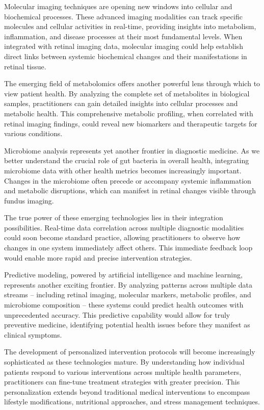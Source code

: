 \documentclass[
  Letterpaper,
]{scrbook}
\begin{document}
Molecular imaging techniques are opening new windows into cellular and
biochemical processes. These advanced imaging modalities can track
specific molecules and cellular activities in real-time, providing
insights into metabolism, inflammation, and disease processes at their
most fundamental levels. When integrated with retinal imaging data,
molecular imaging could help establish direct links between systemic
biochemical changes and their manifestations in retinal tissue.

The emerging field of metabolomics offers another powerful lens through
which to view patient health. By analyzing the complete set of
metabolites in biological samples, practitioners can gain detailed
insights into cellular processes and metabolic health. This
comprehensive metabolic profiling, when correlated with retinal imaging
findings, could reveal new biomarkers and therapeutic targets for
various conditions.

Microbiome analysis represents yet another frontier in diagnostic
medicine. As we better understand the crucial role of gut bacteria in
overall health, integrating microbiome data with other health metrics
becomes increasingly important. Changes in the microbiome often precede
or accompany systemic inflammation and metabolic disruptions, which can
manifest in retinal changes visible through fundus imaging.

The true power of these emerging technologies lies in their integration
possibilities. Real-time data correlation across multiple diagnostic
modalities could soon become standard practice, allowing practitioners
to observe how changes in one system immediately affect others. This
immediate feedback loop would enable more rapid and precise intervention
strategies.

Predictive modeling, powered by artificial intelligence and machine
learning, represents another exciting frontier. By analyzing patterns
across multiple data streams -- including retinal imaging, molecular
markers, metabolic profiles, and microbiome composition -- these systems
could predict health outcomes with unprecedented accuracy. This
predictive capability would allow for truly preventive medicine,
identifying potential health issues before they manifest as clinical
symptoms.

The development of personalized intervention protocols will become
increasingly sophisticated as these technologies mature. By
understanding how individual patients respond to various interventions
across multiple health parameters, practitioners can fine-tune treatment
strategies with greater precision. This personalization extends beyond
traditional medical interventions to encompass lifestyle modifications,
nutritional approaches, and stress management techniques.
\end{document}
